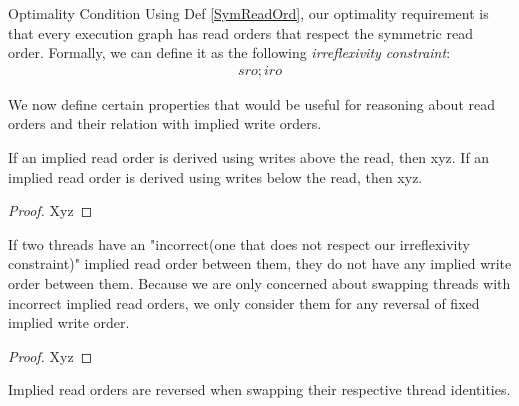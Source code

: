         \begin{definition}{Optimality Condition}
            \label{opt_cond}
            Using Def \ref{SymReadOrd}, our optimality requirement is that every execution graph has read orders that respect the symmetric read order.
            Formally, we can define it as the following \textit{irreflexivity constraint}:
            \begin{align*}
                sro;iro
            \end{align*}

        \end{definition}

        We now define certain properties that would be useful for reasoning about read orders and their relation with implied write orders. 

        \begin{property}
            \label{inf-iwo}
            If an implied read order is derived using writes above the read, then xyz.
            If an implied read order is derived using writes below the read, then xyz.
        \end{property}

        \begin{proof}
            Xyz
        \end{proof}

        \begin{property}
            \label{iro-no-iwo}
            If two threads have an "incorrect(one that does not respect our irreflexivity constraint)" implied read order between them, they do not have any implied write order between them. 
            Because we are only concerned about swapping threads with incorrect implied read orders, we only consider them for any reversal of fixed implied write order.     
        \end{property}

        \begin{proof}
            Xyz
        \end{proof}

        \begin{property}
            \label{iro-Rev}
            Implied read orders are reversed when swapping their respective thread identities.
        \end{property}


